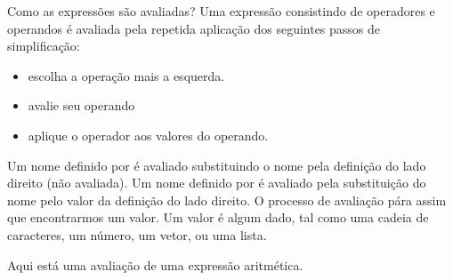 Como as express\~{o}es s\~{a}o avaliadas? Uma express\~{a}o consistindo de operadores e 
operandos \'{e} avaliada pela repetida aplica\c{c}\~{a}o dos seguintes passos de simplifica\c{c}\~{a}o:
\begin{itemize}
\item escolha a opera\c{c}\~{a}o mais a esquerda.
\item avalie seu operando
\item aplique o operador aos valores do operando.
\end{itemize}
Um nome definido por  \'{e} avaliado substituindo o nome pela defini\c{c}\~{a}o do lado
direito (n\~{a}o avaliada). Um nome definido por  \'{e} avaliado pela substitui\c{c}\~{a}o do 
nome pelo valor da defini\c{c}\~{a}o do lado direito. O processo de avalia\c{c}\~{a}o p\'{a}ra assim que 
encontrarmos um valor. Um valor \'{e} algum dado, tal como uma cadeia de caracteres, um n\'{u}mero, 
um vetor, ou uma lista.



\example
Aqui est\'{a} uma avalia\c{c}\~{a}o de uma express\~{a}o aritm\'{e}tica.

